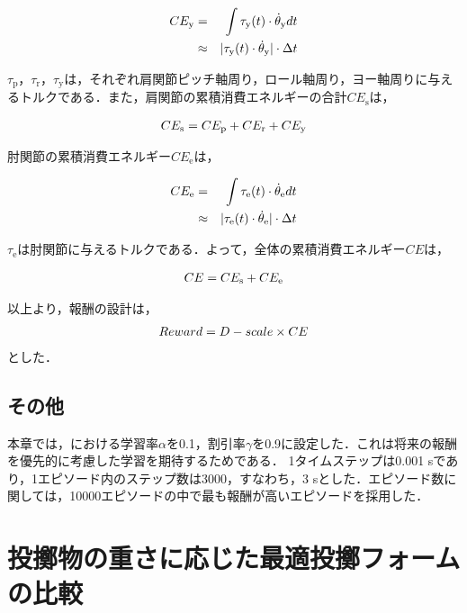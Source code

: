 \begin{eqnarray}
  \equlabel{5.9}
  CE_{\mathrm{y}}&=&\int \tau_{\mathrm{y}}(t)\cdot\dot{\theta}_{\mathrm{y}} dt\\
        &\approx&|\tau_{\mathrm{y}}(t)\cdot\dot{\theta}_{\mathrm{y}}|\cdot\Delta t
\end{eqnarray}

$\tau_{\mathrm{p}}，\tau_{\mathrm{r}}，\tau_{\mathrm{y}}$は，それぞれ肩関節ピッチ軸周り，ロール軸周り，ヨー軸周りに与えるトルクである．また，肩関節の累積消費エネルギーの合計$CE_{\mathrm{s}}$は，

\begin{eqnarray}
  \equlabel{5.10}
  CE_{\mathrm{s}} = CE_{\mathrm{p}} + CE_{\mathrm{r}} + CE_{\mathrm{y}}
\end{eqnarray}

肘関節の累積消費エネルギー$CE_{\mathrm{e}}$は，

\begin{eqnarray}
  \equlabel{5.11}
  CE_{\mathrm{e}}&=&\int \tau_{\mathrm{e}}(t)\cdot\dot{\theta}_{\mathrm{e}} dt\\
        &\approx&|\tau_{\mathrm{e}}(t)\cdot\dot{\theta}_{\mathrm{e}}|\cdot\Delta t
\end{eqnarray}

$\tau_{\mathrm{e}}$は肘関節に与えるトルクである．よって，全体の累積消費エネルギー$CE$は，

\begin{eqnarray}
  \equlabel{5.12}
  CE = CE_{\mathrm{s}} + CE_{\mathrm{e}}
\end{eqnarray}

以上より，報酬の設計は，
\begin{eqnarray}
  \equlabel{5.13}
  Reward = D - scale \times CE
\end{eqnarray}
とした．

\subsection{その他}
本章では，における学習率$\alpha$を0.1，割引率$\gamma$を0.9に設定した．これは将来の報酬を優先的に考慮した学習を期待するためである．
1タイムステップは0.001 sであり，1エピソード内のステップ数は3000，すなわち，3 sとした．エピソード数に関しては，10000エピソードの中で最も報酬が高いエピソードを採用した．

\section{投擲物の重さに応じた最適投擲フォームの比較}
